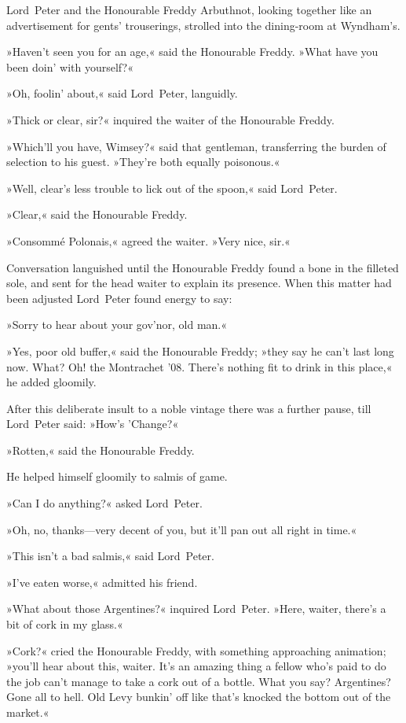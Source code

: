 Lord~Peter and the Honourable Freddy Arbuthnot, looking together like an advertisement for gents' trouserings, strolled into the dining-room at Wyndham's.

»Haven't seen you for an age,« said the Honourable Freddy. »What have you been doin' with yourself?«

»Oh, foolin' about,« said Lord~Peter, languidly.

»Thick or clear, sir?« inquired the waiter of the Honourable Freddy.

»Which'll you have, Wimsey?« said that gentleman, transferring the burden of selection to his guest. »They're both equally poisonous.«

»Well, clear's less trouble to lick out of the spoon,« said Lord~Peter.

»Clear,« said the Honourable Freddy.

»Consommé Polonais,« agreed the waiter. »Very nice, sir.«

Conversation languished until the Honourable Freddy found a bone in the filleted sole, and sent for the head waiter to explain its presence. When this matter had been adjusted Lord~Peter found energy to say:

»Sorry to hear about your gov'nor, old man.«

»Yes, poor old buffer,« said the Honourable Freddy; »they say he can't last long now. What? Oh! the Montrachet '08. There's nothing fit to drink in this place,« he added gloomily.

After this deliberate insult to a noble vintage there was a further pause, till Lord~Peter said: »How's 'Change?«

»Rotten,« said the Honourable Freddy.

He helped himself gloomily to salmis of game.

»Can I do anything?« asked Lord~Peter.

»Oh, no, thanks—very decent of you, but it'll pan out all right in time.«

»This isn't a bad salmis,« said Lord~Peter.

»I've eaten worse,« admitted his friend.

»What about those Argentines?« inquired Lord~Peter. »Here, waiter, there's a bit of cork in my glass.«

»Cork?« cried the Honourable Freddy, with something approaching animation; »you'll hear about this, waiter. It's an amazing thing a fellow who's paid to do the job can't manage to take a cork out of a bottle. What you say? Argentines? Gone all to hell. Old Levy bunkin' off like that's knocked the bottom out of the market.«

